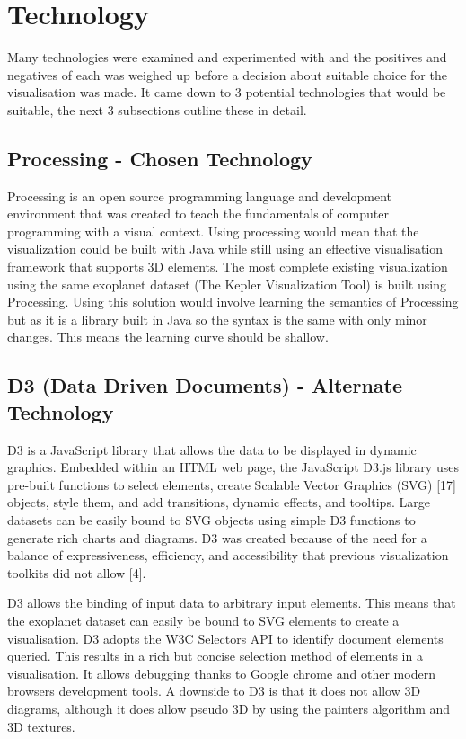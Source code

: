 \chapter{Technology} 

Many technologies were examined and experimented with and the positives and
negatives of each was weighed up before a decision about
suitable choice for the visualisation was made. It came down to 3 potential
technologies
that
would be suitable, the next 3 subsections outline these in
detail.

\section{Processing - Chosen Technology}
Processing is an open source programming language and development environment
that was created to teach the fundamentals of computer programming with a visual
context.
Using processing would mean that the visualization could be built with Java
while still using
an effective visualisation framework that supports 3D elements. The most
complete existing visualization
using
the same exoplanet dataset (The Kepler Visualization Tool) is built using
Processing.
Using this solution would involve learning the semantics of Processing but as it
is a library built in Java so the syntax is the same with only minor changes.
This means the learning
curve should be shallow.

\section{D3 (Data Driven Documents) - Alternate Technology}
D3 is a JavaScript library that allows the data to be displayed in dynamic
graphics. Embedded
within an HTML web page, the JavaScript D3.js library uses pre-built
functions to
select elements, create Scalable Vector Graphics (SVG) [17] objects, style them,
and add transitions,
dynamic effects, and tooltips. Large datasets can be easily bound to SVG objects
using
simple D3 functions to generate rich charts and diagrams. D3 was created because
of the
need for a balance of expressiveness, efficiency, and accessibility that
previous visualization
toolkits did not allow [4].

D3 allows the binding of input data to arbitrary input elements. This means that
the exoplanet dataset can easily be bound to SVG elements to create a
visualisation. D3
adopts the W3C Selectors API to identify document elements queried. This results
in a
rich but concise selection method of elements in a visualisation. It allows
debugging thanks to Google chrome and other modern browsers
development tools. A downside to D3 is that it does not allow 3D diagrams,
although it does
allow pseudo 3D by using the painters algorithm and 3D textures.

